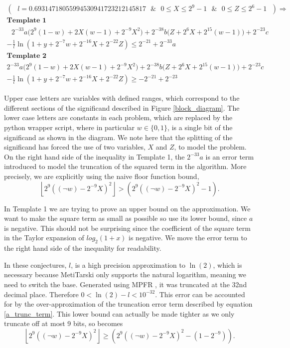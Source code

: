 \documentclass{fac}
\begin{document}
\begin{multline*}
(\textrm{ }l=0.69314718055994530941723212145817\textrm{ } \&\textrm{ } 0\leq X \leq2^9-1\textrm{ } \& \textrm{ }0\leq Z \leq 2^6-1\textrm{ }) \Rightarrow \\ 
\textbf{Template 1} \\
  \textrm{ }  2^{-33} a\Big(2^9(1-w)+2X(w-1)+ 2^{-9}X^{2}\Big)   +  2^{-38} b\Big(Z +2^{6}X + 2^{15}(w-1)\Big)+  2^{-23}c\\
-  \frac{1}{l}\ln(1+y+2^{-7}w+2^{-16}X+2^{-22}Z)      \leq 2^{-21}+2^{-33}a 
\end{multline*} 
\begin{multline*}
\textbf{Template 2} \\
2^{-33} a\Big(2^9(1-w)+2X(w-1)+ 2^{-9}X^{2}\Big)   +  2^{-38} b\Big(Z +2^{6}X + 2^{15}(w-1)\Big)+  2^{-23}c\\
-  \frac{1}{l}\ln(1+y+2^{-7}w+2^{-16}X+2^{-22}Z)      \geq -2^{-21}+2^{-23}
\end{multline*}

Upper case letters are variables with defined ranges, which correspond to the different sections of the significand described in Figure \ref{block_diagram}. The lower case letters are constants in each problem, which are replaced by the python wrapper script, where in particular $w\in \{0,1\}$, is a single bit of the significand as shown in the diagram. We note here that the splitting of the significand has forced the use of two variables, $X$ and $Z$, to model the problem. On the right hand side of the inequality in Template 1, the $2^{-33}a$ is an error term introduced to model the truncation of the squared term in the algorithm. More precisely, we are explicitly using the naive floor function bound,
\begin{equation} \label{a_trunc_term}
    \left \lfloor2^9((\neg{w})-2^{-9}X)^2\right \rfloor  
    >
    (2^9((\neg{w})-2^{-9}X)^2-1).
\end{equation}

In Template 1 we are trying to prove an upper bound on the approximation. We want to make the square term as small as possible so use its lower bound, since $a$ is negative. This should not be surprising since the coefficient of the square term in the Taylor expansion of $log_2(1+x)$ is negative. We move the error term to the right hand side of the inequality for readability. 

In these conjectures, $l$, is a high precision approximation to $\ln(2)$, which is necessary because MetiTarski only supports the natural logarithm, meaning we need to switch the base. Generated using MPFR \cite{fousse2007mpfr}, it was truncated at the 32nd decimal place. Therefore $0<\ln{(2)}-l<10^{-32}$. This error can be accounted for by the over-approximation of the truncation error term described by equation \ref{a_trunc_term}. This lower bound can actually be made tighter as we only truncate off at most 9 bits, so becomes
\begin{equation*} 
    \left \lfloor2^9((\neg{w})-2^{-9}X)^2\right \rfloor  
    \geq 
    (2^9((\neg{w})-2^{-9}X)^2-(1-2^{-9})).
\end{equation*}
\end{document}
